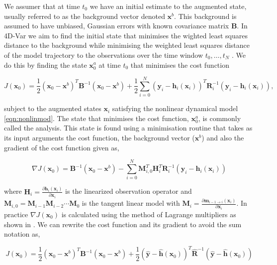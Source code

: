 \documentclass[review]{elsarticle}
\begin{document}
We assumer that at time $t_{0}$ we have an initial estimate to the augmented state, usually referred to as the background vector denoted $\textbf{x}^{b}$. This background is assumed to have unbiased, Gaussian errors with known covariance matrix $\textbf{B}$. In 4D-Var we aim to find the initial state that minimises the wighted least squares distance to the background while minimising the weighted least squares distance of the model trajectory to the observations over the time window $t_{0}, \dots, t_{N}$ \citep{lawless2013}. We do this by finding the state $\textbf{x}^{a}_{0}$ at time $t_{0}$ that minimises the cost function
\begin{linenomath}
\begin{equation}
J(\textbf{x}_0) = \frac{1}{2}(\textbf{x}_0-\textbf{x}^b)^{T}\textbf{B}^{-1}(\textbf{x}_0-\textbf{x}^b)+\frac{1}{2}\sum_{i=0}^{N}(\textbf{y}_i-\textbf{h}_i(\textbf{x}_i))^{T}\textbf{R}_{i}^{-1}(\textbf{y}_i-\textbf{h}_i(\textbf{x}_i)),
\end{equation}
\end{linenomath}
subject to the augmented states $\textbf{x}_{i}$ satisfying the nonlinear dynamical model \eqref{eqn:nonlinmod}. The state that minimises the cost function, $\textbf{x}^{a}_{0}$, is commonly called the analysis. This state is found using a minimisation routine that takes as its input arguments the cost function, the background vector ($\textbf{x}^{b}$) and also the gradient of the cost function given as,
\begin{linenomath}
\begin{equation}
\nabla J(\textbf{x}_0) = \textbf{B}^{-1}(\textbf{x}_0-\textbf{x}^{b})-\sum_{i=0}^{N}\textbf{M}_{i,0}^{T}\textbf{H}_i^{T}\textbf{R}_{i}^{-1}(\textbf{y}_i-\textbf{h}_i(\textbf{x}_i))
\end{equation}
\end{linenomath}
where $\textbf{H}_i = \frac{\partial \textbf{h}_i(\textbf{x}_i)}{\partial\textbf{x}_i}$ is the linearized observation operator and $\mathbf{M}_{i,0}=\mathbf{M}_{i-1}\mathbf{M}_{i-2}\cdots\mathbf{M}_0$ is the tangent linear model with $\mathbf{M}_i=\frac{\partial \textbf{m}_{i-1\rightarrow i}(\textbf{x}_{i})}{\partial \textbf{x}_{i}}$. In practice $\nabla J(\textbf{x}_0)$ is calculated using the method of Lagrange multipliers as shown in \citet{lawless2013}. We can rewrite the cost function and its gradient to avoid the sum notation as,
\begin{linenomath}
\begin{equation}
J(\textbf{x}_0) = \frac{1}{2}(\textbf{x}_0-\textbf{x}^b)^{T}\textbf{B}^{-1}(\textbf{x}_0-\textbf{x}^b)+\frac{1}{2}(\hat{\textbf{y}}-\hat{\textbf{h}}(\textbf{x}_0))^{T}\hat{\textbf{R}}^{-1}(\hat{\textbf{y}}-\hat{\textbf{h}}(\textbf{x}_0)) \label{costfn}
\end{equation}
\end{linenomath}
\end{document}
